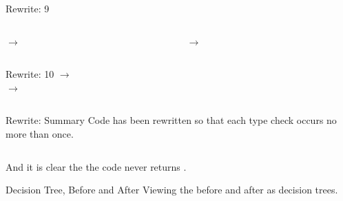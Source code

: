 \begin{frame}{Rewrite: 9}

  \begin{columns}
    \begin{column}{0.5\textwidth}
      \colorbox{pink!30}{ $\to$ }
      \usebox\typecaseIbox
    \end{column}
    \begin{column}{0.5\textwidth}  %
      \colorbox{pink!30}{ $\to$ }
      \usebox\typecaseJhbox
    \end{column}    
  \end{columns}
\end{frame}

\begin{frame}{Rewrite: 10}
  \colorbox{pink!30}{ $\to$ }\\
  \colorbox{pink!30}{ $\to$ }

  \begin{columns}
    \begin{column}{0.5\textwidth}
      \usebox\typecaseJbox
    \end{column}
    \begin{column}{0.5\textwidth}  %
      \usebox\typecaseKhbox
    \end{column}
  \end{columns}
\end{frame}


\begin{frame}{Rewrite: Summary}
  Code has been rewritten so that each type check occurs no more than once.

  \begin{columns}
    \begin{column}{0.5\textwidth}
      \usebox\typecaseAbox
    \end{column}
    \begin{column}{0.5\textwidth}  %
      \usebox\typecaseKbox
    \end{column}
  \end{columns}

  And it is clear the the code never returns .

\end{frame}

\begin{frame}{Decision Tree, Before and After}
  Viewing the  before and after as decision trees.

  \begin{columns}
    \begin{column}{0.5\textwidth}
      \usebox\typecaseITEbox
    \end{column}
    \begin{column}{0.5\textwidth}  %
      \usebox\typecaseITEafterbox
    \end{column}
  \end{columns}
\end{frame}



